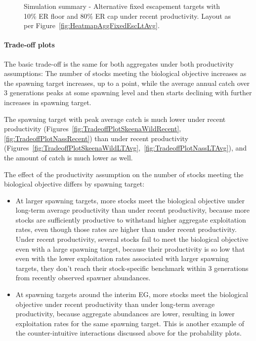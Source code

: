 \documentclass[french,11pt]{book}
\begin{document}
\begin{figure}[htb]

{\centering {} 

}

\caption{Simulation summary - Alternative fixed escapement targets with 10\% ER floor and 80\% ER cap under recent productivity. Layout as per Figure~\ref{fig:HeatmapAggFixedEscLtAvg}.}\label{fig:HeatmapAggFixedEscRecent}
\end{figure}
\clearpage

\paragraph{Trade-off plots}\label{trade-off-plots}

The basic trade-off is the same for both aggregates under both productivity assumptions: The number of stocks meeting the biological objective increases as the spawning target increases, up to a point, while the average annual catch over 3 generations peaks at some spawning level and then starts declining with further increases in spawning target.

The spawning target with peak average catch is much lower under recent productivity (Figures~\ref{fig:TradeoffPlotSkeenaWildRecent},\ref{fig:TradeoffPlotNassRecent}) than under recent productivity (Figures~\ref{fig:TradeoffPlotSkeenaWildLTAvg},~\ref{fig:TradeoffPlotNassLTAvg}), and the amount of catch is much lower as well.

The effect of the productivity assumption on the number of stocks meeting the biological objective differs by spawning target:
\begin{itemize}
\item
  At larger spawning targets, more stocks meet the biological objective under long-term average productivity than under recent productivity, because more stocks are sufficiently productive to withstand higher aggregate exploitation rates, even though those rates are higher than under recent productivity. Under recent productivity, several stocks fail to meet the biological objective even with a large spawning target, because their productivity is so low that even with the lower exploitation rates associated with larger spawning targets, they don't reach their stock-specific benchmark within 3 generations from recently observed spawner abundances.
\item
  At spawning targets around the interim EG, more stocks meet the biological objective under recent productivity than under long-term average productivity, because aggregate abundances are lower, resulting in lower exploitation rates for the same spawning target. This is another example of the counter-intuitive interactions discussed above for the probability plots.
\end{itemize}
\clearpage
\end{document}
